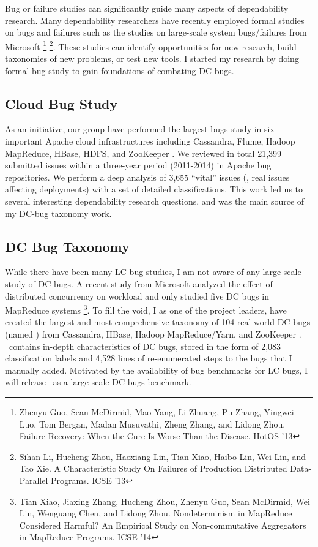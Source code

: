 \documentclass[11pt]{article}
\begin{document}
Bug or failure studies can significantly guide many aspects of dependability
research. Many dependability researchers have recently employed formal studies
on bugs and failures such as the studies on large-scale system bugs/failures
from Microsoft \footnote{Zhenyu Guo, Sean McDirmid, Mao Yang, Li Zhuang, Pu
Zhang, Yingwei Luo, Tom Bergan, Madan Musuvathi, Zheng Zhang, and Lidong Zhou.
Failure Recovery: When the Cure Is Worse Than the Disease. HotOS '13}
\footnote{Sihan Li, Hucheng Zhou, Haoxiang Lin, Tian Xiao, Haibo Lin, Wei Lin,
and Tao Xie. A Characteristic Study On Failures of Production Distributed
Data-Parallel Programs. ICSE '13}. These studies can identify opportunities for
new research, build taxonomies of new problems, or test new tools. I started my
research by doing formal bug study to gain foundations of combating DC bugs.

\subsection{Cloud Bug Study}

As an initiative, our group have performed the largest bugs study in six
important Apache cloud infrastructures including Cassandra, Flume, Hadoop
MapReduce, HBase, HDFS, and ZooKeeper \cite{Gunawi+14-Cbs}. We reviewed in
total 21,399 submitted issues within a three-year period (2011-2014) in Apache
bug repositories. We perform a deep analysis of 3,655 ``vital'' issues (\ie,
real issues affecting deployments) with a set of detailed classifications. This
work led us to several interesting dependability research questions, and was
the main source of my DC-bug taxonomy work.

\subsection{DC Bug Taxonomy} 

While there have been many LC-bug studies, I am not aware of any large-scale
study of DC bugs. A recent study from Microsoft analyzed the effect of
distributed concurrency on workload and only studied five DC bugs in MapReduce
systems \footnote{Tian Xiao, Jiaxing Zhang, Hucheng Zhou, Zhenyu Guo, Sean
McDirmid, Wei Lin, Wenguang Chen, and Lidong Zhou. Nondeterminism in MapReduce
Considered Harmful?  An Empirical Study on Non-commutative Aggregators in
MapReduce Programs. ICSE '14}. To fill the void, I as one of the project
leaders, have created the largest and most comprehensive taxonomy of 104
real-world DC bugs (named \taxdc) from Cassandra, HBase, Hadoop MapReduce/Yarn,
and ZooKeeper \cite{Gunawi+16-TaxDc-Appear}. \taxdc\ contains in-depth
characteristics of DC bugs, stored in the form of 2,083 classification labels
and 4,528 lines of re-enumerated steps to the bugs that I manually added.
Motivated by the availability of bug benchmarks for LC bugs, I will release
\taxdc\ as a large-scale DC bugs benchmark.
\end{document}
